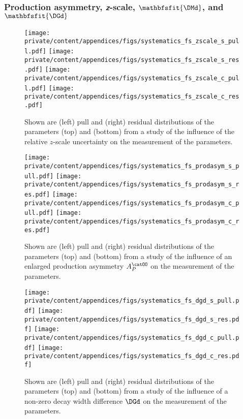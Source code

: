 \clearpage
\subsubsection[Production asymmetry, $z$-scale, \DMd, and \DGd]{Production asymmetry, $\mathbfsfit{z}$-scale, $\mathbfsfit{\DMd}$, and $\mathbfsfit{\DGd}$}
\label{sec:app:measurement_of_sin2beta:systematics:systematics:further_studies}

\begin{figure}[h]
  \texttt{[image: private/content/appendices/figs/systematics\_fs\_zscale\_s\_pull.pdf]}\hfill
  \texttt{[image: private/content/appendices/figs/systematics\_fs\_zscale\_s\_res.pdf]}
  \texttt{[image: private/content/appendices/figs/systematics\_fs\_zscale\_c\_pull.pdf]}\hfill
  \texttt{[image: private/content/appendices/figs/systematics\_fs\_zscale\_c\_res.pdf]}
\caption{Shown are (left) pull and (right) residual distributions of the
parameters (top) \SJpsiKS and (bottom) \CJpsiKS from a \ToyMC study of the
influence of the relative $z$-scale uncertainty on the measurement of the \CP
parameters.}
\label{fig:app:measurement_of_sin2beta:systematics:systematics:further_studies:zscale}
\end{figure}

\begin{figure}[h]
  \texttt{[image: private/content/appendices/figs/systematics\_fs\_prodasym\_s\_pull.pdf]}\hfill
  \texttt{[image: private/content/appendices/figs/systematics\_fs\_prodasym\_s\_res.pdf]}
  \texttt{[image: private/content/appendices/figs/systematics\_fs\_prodasym\_c\_pull.pdf]}\hfill
  \texttt{[image: private/content/appendices/figs/systematics\_fs\_prodasym\_c\_res.pdf]}
\caption{Shown are (left) pull and (right) residual distributions of the
parameters (top) \SJpsiKS and (bottom) \CJpsiKS from a \ToyMC study of the
influence of an enlarged production asymmetry $A_P^{\catOO}$ on the measurement
of the \CP parameters.}
\label{fig:app:measurement_of_sin2beta:systematics:systematics:further_studies:production_asymmetry}
\end{figure}

\begin{figure}[h]
  \texttt{[image: private/content/appendices/figs/systematics\_fs\_dgd\_s\_pull.pdf]}\hfill
  \texttt{[image: private/content/appendices/figs/systematics\_fs\_dgd\_s\_res.pdf]}
  \texttt{[image: private/content/appendices/figs/systematics\_fs\_dgd\_c\_pull.pdf]}\hfill
  \texttt{[image: private/content/appendices/figs/systematics\_fs\_dgd\_c\_res.pdf]}
\caption{Shown are (left) pull and (right) residual distributions of the
parameters (top) \SJpsiKS and (bottom) \CJpsiKS from a \ToyMC study of the
influence of a non-zero decay width difference $\DGd$ on the measurement
of the \CP parameters.}
\label{fig:app:measurement_of_sin2beta:systematics:systematics:further_studies:decay_width_difference}
\end{figure}

